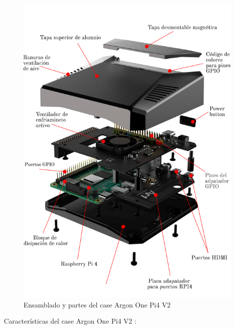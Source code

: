 \begin{figure}[htpb]
\centering 
\includegraphics[width=1.0\textwidth]{./Figures/armadoactuador.png}
\caption{Ensamblado y partes del case Argon One Pi4 V2 }
\label{fig:argon}
\end{figure}
\vspace{0.5cm}
Características del case Argon One Pi4 V2 \citep{WEBSITE:16}:

